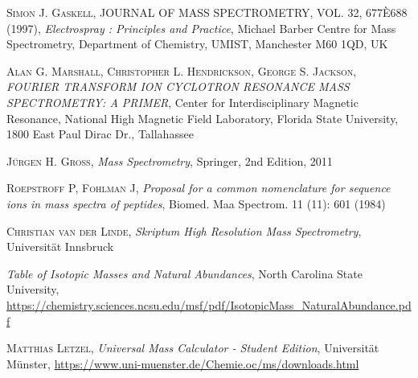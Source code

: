 \documentclass[a4paper,10pt]{article}
\begin{document}
\begin{thebibliography}{99}
\textsc{Simon J. Gaskell}, JOURNAL OF MASS SPECTROMETRY, VOL. 32, 677È688 (1997), \textit{Electrospray : Principles and Practice}, Michael Barber Centre for Mass Spectrometry, Department of Chemistry, UMIST, Manchester M60 1QD, UK

\textsc{Alan G. Marshall, Christopher L. Hendrickson, George S. Jackson}, \textit{FOURIER TRANSFORM ION CYCLOTRON RESONANCE MASS SPECTROMETRY: A PRIMER}, Center for Interdisciplinary Magnetic Resonance, National High Magnetic Field Laboratory, Florida State University, 1800 East Paul Dirac Dr., Tallahassee

\textsc{Jürgen H. Gross}, \textit{Mass Spectrometry}, Springer, 2nd Edition, 2011

\textsc{Roepstroff P, Fohlman J}, \textit{Proposal for a common nomenclature for sequence ions in mass spectra of peptides}, Biomed. Maa Spectrom. 11 (11): 601 (1984)

\textsc{Christian van der Linde}, \textit{Skriptum High Resolution Mass Spectrometry}, Universität Innsbruck

\textit{Table of Isotopic Masses and Natural Abundances}, North Carolina State University, \url{https://chemistry.sciences.ncsu.edu/msf/pdf/IsotopicMass_NaturalAbundance.pdf}

\textsc{Matthias Letzel}, \textit{Universal Mass Calculator - Student Edition}, Universität Münster, \url{https://www.uni-muenster.de/Chemie.oc/ms/downloads.html}

\end{thebibliography}
\end{document}
